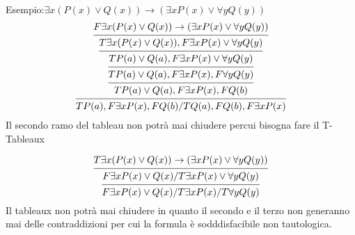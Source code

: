 Esempio:$\exists x (P(x) \lor Q(x)) \rightarrow (\exists x P(x) \lor \forall y Q(y))$
\begin{equation*}
\begin{prooftree}
\hypo{F \exists x (P(x) \lor Q(x)) \rightarrow (\exists x P(x) \lor \forall y Q(y))}
\infer1 {T \exists x (P(x) \lor Q(x)), F \exists x P(x) \lor \forall y Q(y)}
\infer1{T P(a) \lor Q(a), F \exists x P(x) \lor \forall y Q(y)}
\infer1 {T P(a) \lor Q(a), F \exists x P(x), F \forall y Q(y)}
\infer1 {T P(a) \lor Q(a), F \exists x P(x), F Q(b)}
\infer1 {T P(a),F \exists x P(x),F Q(b)/T Q(a),F Q(b),F \exists x P(x)}
\end{prooftree}
\end{equation*}
Il secondo ramo del tableau non potrà mai chiudere percui bisogna fare il T-Tableaux

\begin{equation*}
\begin{prooftree}
\hypo{T \exists x (P(x) \lor Q(x)) \rightarrow (\exists x P(x) \lor \forall y Q(y))}
\infer1 {F \exists x P(x) \lor Q(x)/T \exists x P(x) \lor \forall y Q(y)}
\infer1 {F \exists x P(x) \lor Q(x)/T \exists x P(x)/T \forall y Q(y)}
\end{prooftree}
\end{equation*}
Il tableaux non potrà mai chiudere in quanto il secondo e il terzo non generanno mai delle contraddizioni
per cui la formula è sodddisfacibile non tautologica.
